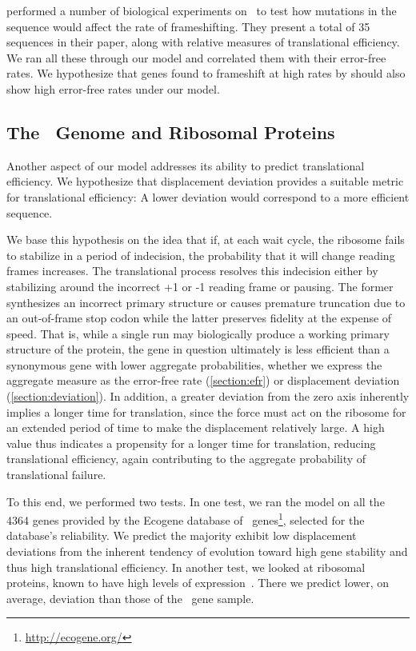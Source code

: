 \documentclass[12pt]{article}
\numberwithin{equation}{section}
\begin{document}
\citet{weiss87} performed a number of biological experiments on
\prfB\ to test how mutations in the sequence would affect the rate of
frameshifting.  They present a total of 35 sequences in their paper,
along with relative measures of translational efficiency.  We ran all
these through our model and correlated them with their error-free rates.
We hypothesize that genes found to frameshift at high rates by
\citeauthor{weiss87} should also show high error-free rates under
our model.

\subsection{The \ecoli\ Genome and Ribosomal Proteins}
Another aspect of our model addresses its ability to predict
translational efficiency. We hypothesize that displacement deviation
provides a suitable metric for translational efficiency: A lower
deviation would correspond to a more efficient sequence.

We base this hypothesis on the idea that if, at each wait cycle, the
ribosome fails to stabilize in a period of indecision, the probability
that it will change reading frames increases. The translational
process resolves this indecision either by stabilizing around the
incorrect +1 or -1 reading frame or pausing. The former synthesizes an
incorrect primary structure or causes premature truncation due to an
out-of-frame stop codon while the latter preserves fidelity at the
expense of speed. That is, while a single run may biologically produce
a working primary structure of the protein, the gene in question
ultimately is less efficient than a synonymous gene with lower
aggregate probabilities, whether we express the aggregate measure as the
error-free rate (\autoref{section:efr}) or displacement deviation
(\autoref{section:deviation}). In addition, a greater deviation from
the zero axis inherently implies a longer time for translation, since
the force must act on the ribosome for an extended period of time to
make the displacement relatively large. A high value thus indicates a
propensity for a longer time for translation, reducing translational
efficiency, again contributing to the aggregate probability of
translational failure.

To this end, we performed two tests. In one test, we ran the model on
all the 4364 genes provided by the Ecogene database of
\ecoli\ genes\footnote{\url{http://ecogene.org/}}, selected for the
database's reliability. We predict the majority exhibit low
displacement deviations from the inherent tendency of evolution toward
high gene stability and thus high translational efficiency. In another
test, we looked at ribosomal proteins, known to have high levels of
expression~\cite{rpoS:process}. There we predict lower, on average,
deviation than those of the \ecoli\ gene sample.
	
\end{document}

